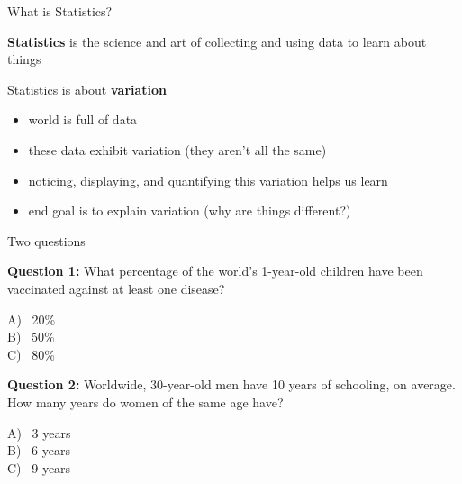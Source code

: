 \documentclass{beamer}
\begin{document}
\begin{frame}{What is Statistics?}

\textbf{Statistics} is the science and art of collecting and using data to learn about things
\vspace{4mm}

Statistics is about \textbf{variation}
\begin{itemize}
\item world is full of data
\item these data exhibit variation (they aren't all the same)
\item noticing, displaying, and quantifying this variation helps us learn
\item end goal is to explain variation (why are things different?)
\end{itemize}

\end{frame}


\begin{frame}{Two questions}

\textbf{Question 1:} What percentage of the world's 1-year-old children have been vaccinated against at least one disease? \vspace{2mm}

A) \ 20\% \\
B) \ 50\% \\
C) \ 80\% \\

\vspace{4mm}

\textbf{Question 2:} Worldwide, 30-year-old men have 10 years of schooling, on average. How many years do women of the same age have? \vspace{2mm}

A) \ 3 years \\
B) \ 6 years \\
C) \ 9 years \\


\end{frame}
\end{document}
